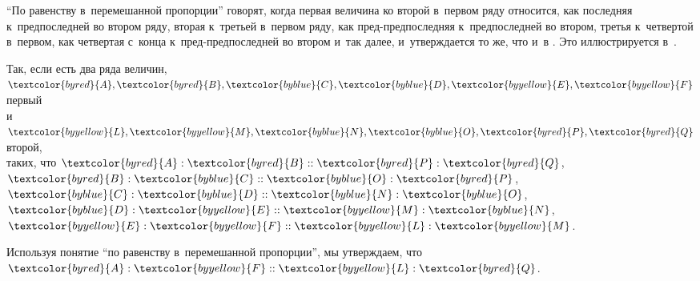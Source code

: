 \documentclass[letters,booklanguage=russian]{byrnebook}
\begin{document}
\vfill\pagebreak

\def\varA{\textcolor{byred}{A}}
\def\varB{\textcolor{byred}{B}}
\def\varC{\textcolor{byblue}{C}}
\def\varD{\textcolor{byblue}{D}}
\def\varE{\textcolor{byyellow}{E}}
\def\varF{\textcolor{byyellow}{F}}
\def\varL{\textcolor{byyellow}{L}}
\def\varM{\textcolor{byyellow}{M}}
\def\varN{\textcolor{byblue}{N}}
\def\varO{\textcolor{byblue}{O}}
\def\varP{\textcolor{byred}{P}}
\def\varQ{\textcolor{byred}{Q}}
\enquote{По равенству в~перемешанной пропорции} говорят, когда первая величина ко второй в~первом ряду относится, как последняя к~предпоследней во втором ряду, вторая к~третьей в~первом ряду, как пред-предпоследняя к~предпоследней во втором, третья к~четвертой в~первом, как четвертая с~конца к~пред-предпоследней во втором и~так далее, и~утверждается то же, что и~в . Это иллюстрируется в~.

\begin{center}
Так, если есть два ряда величин,\\
$\varA, \varB, \varC, \varD, \varE, \varF$ первый\\
и $\varL, \varM, \varN, \varO, \varP, \varQ$ второй,\\
таких, что $\varA : \varB :: \varP : \varQ$, $\varB : \varC :: \varO : \varP$, $\varC : \varD :: \varN : \varO$, $\varD : \varE :: \varM : \varN$, $\varE : \varF :: \varL : \varM$.

Используя понятие \enquote{по равенству в~перемешанной пропорции}, мы утверждаем, что $\varA : \varF :: \varL : \varQ$.
\end{center}

\vfill\pagebreak

\end{document}
